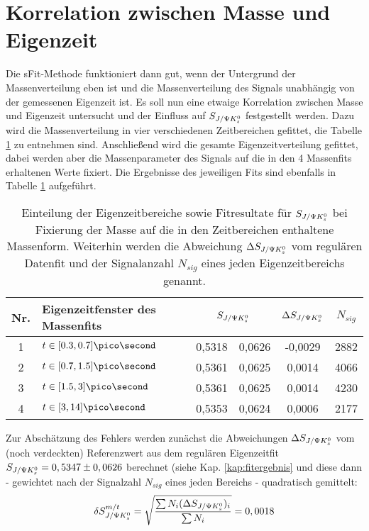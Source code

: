 \section{Korrelation zwischen Masse und Eigenzeit}
Die sFit-Methode funktioniert dann gut, wenn der Untergrund der Massenverteilung eben ist und die Massenverteilung des Signals unabhängig von der gemessenen Eigenzeit ist. Es soll nun eine etwaige Korrelation zwischen Masse und Eigenzeit untersucht und der Einfluss auf $S_{J/\Psi K_s^0}$ festgestellt werden. Dazu wird die Massenverteilung in vier verschiedenen Zeitbereichen gefittet, die Tabelle \ref{tab:mass_ct} zu entnehmen sind. Anschließend wird die gesamte Eigenzeitverteilung gefittet, dabei werden aber die Massenparameter des Signals auf die in den 4 Massenfits erhaltenen Werte fixiert. Die Ergebnisse des jeweiligen Fits sind ebenfalls in Tabelle \ref{tab:mass_ct} aufgeführt.

\begin{table}[hptb]
\centering
\caption{Einteilung der Eigenzeitbereiche sowie Fitresultate für $S_{J/\Psi K_s^0}$ bei Fixierung der Masse auf die in den Zeitbereichen enthaltene Massenform. Weiterhin werden die Abweichung $\Delta S_{J/\Psi K_s^0}$ vom regulären Datenfit und der Signalanzahl $N_{sig}$ eines jeden Eigenzeitbereichs genannt.}
\label{tab:mass_ct}
\begin{tabular}{c l r@{$\pm$}l c c}
\hline \hline
Nr. & Eigenzeitfenster des Massenfits & \multicolumn{2}{c}{$S_{J/\Psi K_s^0}$} & $\Delta S_{J/\Psi K_s^0}$ & $N_{sig}$\\ \hline
1 & $t \in [0.3, 0.7] \pico\second$ & 0,5318 & 0,0626 & -0,0029 & 2882 \\
2 & $t \in [0.7, 1.5] \pico\second$ & 0,5361 & 0,0625 & 0,0014 & 4066 \\
3 & $t \in [1.5, 3] \pico\second$ & 0,5361 & 0,0625 & 0,0014 & 4230 \\
4 & $t \in [3, 14] \pico\second$ & 0,5353 & 0,0624 & 0,0006 & 2177 \\ \hline \hline
\end{tabular}
\end{table}

Zur Abschätzung des Fehlers werden zunächst die Abweichungen $\Delta S_{J/\Psi K_s^0}$ vom (noch verdeckten) Referenzwert aus dem regulären Eigenzeitfit $S_{J/\Psi K_s^0} = 0,5347 \pm 0,0626$ berechnet (siehe Kap. \ref{kap:fitergebnis} und diese dann - gewichtet nach der Signalzahl $N_{sig}$ eines jeden Bereichs - quadratisch gemittelt:
\begin{align}
\delta S_{J/\Psi K_s^0}^{m/t} = \sqrt{\frac{\sum N_i (\Delta S_{J/\Psi K_s^0})_i}{\sum N_i}} = 0,0018
\end{align}


